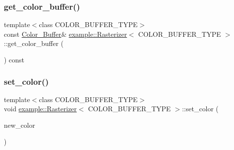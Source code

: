 \subsubsection{\texorpdfstring{get\_color\_buffer()}{get\_color\_buffer()}}
{\footnotesize\ttfamily template$<$class C\+O\+L\+O\+R\+\_\+\+B\+U\+F\+F\+E\+R\+\_\+\+T\+Y\+PE$>$ \\
const \mbox{\hyperlink{classexample_1_1_rasterizer_a710beccb975a5f1aa771c44f784da525}{Color\+\_\+\+Buffer}}\& \mbox{\hyperlink{classexample_1_1_rasterizer}{example\+::\+Rasterizer}}$<$ C\+O\+L\+O\+R\+\_\+\+B\+U\+F\+F\+E\+R\+\_\+\+T\+Y\+PE $>$\+::get\+\_\+color\+\_\+buffer (\begin{DoxyParamCaption}{ }\end{DoxyParamCaption}) const\hspace{0.3cm}{\ttfamily [inline]}}

\mbox{\label{classexample_1_1_rasterizer_a6770b1e636262a2977ee2ccca726b134}} 
\subsubsection{\texorpdfstring{set\_color()}{set\_color()}\hspace{0.1cm}{\footnotesize\ttfamily [1/2]}}
{\footnotesize\ttfamily template$<$class C\+O\+L\+O\+R\+\_\+\+B\+U\+F\+F\+E\+R\+\_\+\+T\+Y\+PE$>$ \\
void \mbox{\hyperlink{classexample_1_1_rasterizer}{example\+::\+Rasterizer}}$<$ C\+O\+L\+O\+R\+\_\+\+B\+U\+F\+F\+E\+R\+\_\+\+T\+Y\+PE $>$\+::set\+\_\+color (\begin{DoxyParamCaption}\item[{const \mbox{\hyperlink{classexample_1_1_rasterizer_aabfa22a5aef17d16a0cfb362fa30e69b}{Color}} \&}]{new\+\_\+color }\end{DoxyParamCaption})\hspace{0.3cm}{\ttfamily [inline]}}

\mbox{\label{classexample_1_1_rasterizer_a0043c4af15566e7f0463a22c04c67812}} 
